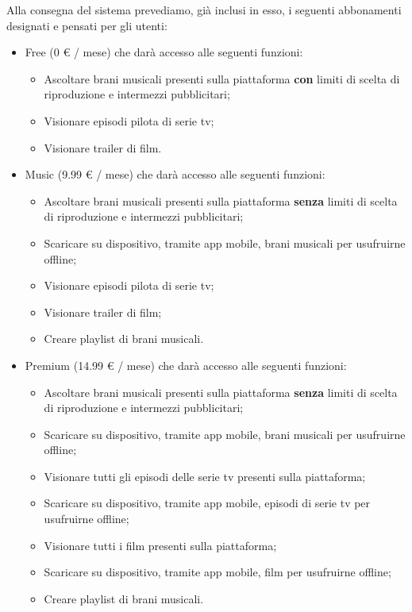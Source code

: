 Alla consegna del sistema prevediamo, già inclusi in esso, i seguenti abbonamenti designati e pensati per gli utenti:
\begin{itemize}
    \item Free (0 € / mese) che darà accesso alle seguenti funzioni: 
	\begin{itemize}
   		\item Ascoltare brani musicali presenti sulla piattaforma \textbf{con} limiti di scelta di riproduzione e intermezzi pubblicitari;
		\item Visionare episodi pilota di serie tv;
		\item Visionare trailer di film.
	\end{itemize}
    \item Music (9.99 € / mese) che darà accesso alle seguenti funzioni:
	\begin{itemize}
   		\item Ascoltare brani musicali presenti sulla piattaforma \textbf{senza} limiti di scelta di riproduzione e intermezzi pubblicitari;
		\item Scaricare su dispositivo, tramite app mobile, brani musicali per usufruirne offline;
		\item Visionare episodi pilota di serie tv;
		\item Visionare trailer di film;
		\item Creare playlist di brani musicali.
	\end{itemize}
    \item Premium (14.99 € / mese) che darà accesso alle seguenti funzioni:
	\begin{itemize}
   		\item Ascoltare brani musicali presenti sulla piattaforma \textbf{senza} limiti di scelta di riproduzione e intermezzi pubblicitari;
		\item Scaricare su dispositivo, tramite app mobile, brani musicali per usufruirne offline;
		\item Visionare tutti gli episodi delle serie tv presenti sulla piattaforma;
		\item Scaricare su dispositivo, tramite app mobile, episodi di serie tv per usufruirne offline;
		\item Visionare tutti i film presenti sulla piattaforma;
		\item Scaricare su dispositivo, tramite app mobile, film per usufruirne offline;
		\item Creare playlist di brani musicali.
	\end{itemize}
	

\end{itemize}
